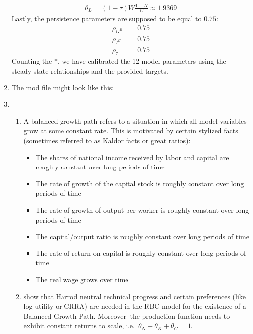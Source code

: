 \begin{enumerate}
\begin{align*}
\theta_L = (1-\tau) W \frac{1-N}{C} \approx 1.9369 \tag*{(*)}
\end{align*}
Lastly, the persistence parameters are supposed to be equal to \(0.75\):
\begin{align*}
\rho_{G^B} &= 0.75 \tag*{(*)}
\\
\rho_{I^G} &= 0.75 \tag*{(*)}
\\
\rho_{\tau} &= 0.75 \tag*{(*)}
\end{align*}
Counting the \(*\), we have calibrated the 12 model parameters using the steady-state relationships and the provided targets.

\item
The mod file might look like this:


\item 

\begin{enumerate}    
\item
A balanced growth path refers to a situation in which all model variables grow at some constant rate.
This is motivated by certain stylized facts (sometimes referred to as Kaldor facts or great ratios):
\begin{itemize}
\item The shares of national income received by labor and capital are roughly constant over long periods of time
\item The rate of growth of the capital stock is roughly constant over long periods of time
\item The rate of growth of output per worker is roughly constant over long periods of time
\item The capital/output ratio is roughly constant over long periods of time
\item The rate of return on capital is roughly constant over long periods of time
\item The real wage grows over time
\end{itemize}

\item
\textcite{King.Plosser.Rebelo_1988_ProductionGrowthBusiness} show that Harrod neutral technical progress
  and certain preferences (like log-utility or CRRA) are needed in the RBC model for the existence of a Balanced Growth Path.
Moreover, the production function needs to exhibit constant returns to scale, i.e.\
  \(\theta_N+\theta_K+\theta_G=1\).


\end{enumerate}
\end{enumerate}
